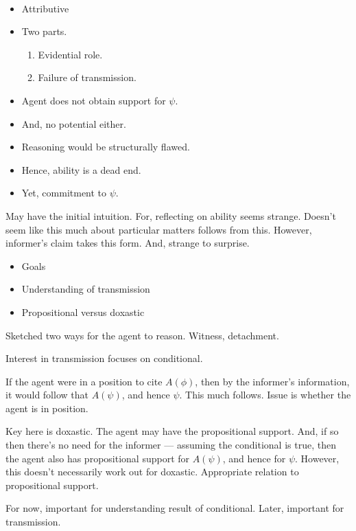 \documentclass[10pt]{article}
\begin{document}
\begin{note}[Goals]\mbox{ }

  \begin{itemize}
  \item Attributive
  \item Two parts.
    \begin{enumerate}
    \item Evidential role.
    \item Failure of transmission.
    \end{enumerate}
  \item Agent does not obtain support for \(\psi\).
  \item And, no potential either.
  \item Reasoning would be structurally flawed.
  \item Hence, ability is a dead end.
  \item Yet, commitment to \(\psi\).
  \end{itemize}

  May have the initial intuition.
  For, reflecting on ability seems strange.
  Doesn't seem like this much about particular matters follows from this.
  However, informer's claim takes this form.
  And, strange to surprise.

  \begin{itemize}
  \item Goals
  \item Understanding of transmission
  \item Propositional versus doxastic
  \end{itemize}
\end{note}

Sketched two ways for the agent to reason.
Witness, detachment.

Interest in transmission focuses on conditional.

If the agent were in a position to cite \(A(\phi)\), then by the informer's information, it would follow that \(A(\psi)\), and hence \(\psi\).
This much follows.
Issue is whether the agent is in position.

Key here is doxastic.
The agent may have the propositional support.
And, if so then there's no need for the informer --- assuming the conditional is true, then the agent also has propositional support for \(A(\psi)\), and hence for \(\psi\).
However, this doesn't necessarily work out for doxastic.
Appropriate relation to propositional support.

For now, important for understanding result of conditional.
Later, important for transmission.
\end{document}

